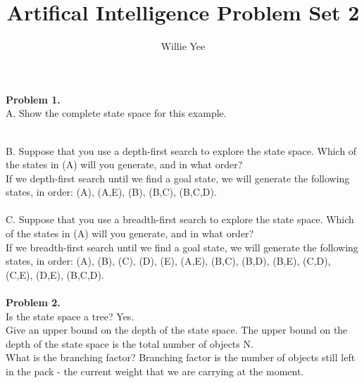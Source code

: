 \documentclass{article}
\begin{document}
\title{Artifical Intelligence Problem Set 2}
\date{}
\author{Willie Yee}
\maketitle
\noindent
\textbf{Problem 1.}\\
A. Show the complete state space for this example.\\
\\
B. Suppose that you use a depth-first search to explore the state space. Which of the states in (A) will you generate, and in what order?\\
If we depth-first search until we find a goal state, we will generate the following states, in order: (A), (A,E), (B), (B,C), (B,C,D).\\
\\
C. Suppose that you use a breadth-first search to explore the state space. Which of the states in (A) will you generate, and in what order?\\
If we breadth-first search until we find a goal state, we will generate the following states, in order: (A), (B), (C), (D), (E), (A,E), (B,C), (B,D), (B,E), (C,D), (C,E), (D,E), (B,C,D).\\\\
\textbf{Problem 2.}\\
Is the state space a tree? Yes.\\
Give an upper bound on the depth of the state space. The upper bound on the depth of the state space is the total number of objects N.\\
What is the branching factor? Branching factor is the number of objects still left in the pack - the current weight that we are carrying at the moment.\\
\end{document}
